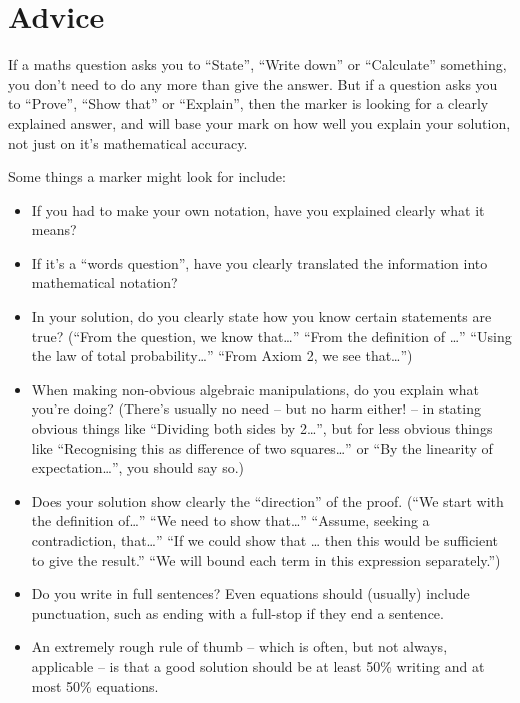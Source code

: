 \documentclass[
  a4paper,
]{book}
\providecommand{\tightlist}{%
  \setlength{\itemsep}{0pt}\setlength{\parskip}{0pt}}
\theoremstyle{definition}
\theoremstyle{definition}
\theoremstyle{definition}
\theoremstyle{definition}
\theoremstyle{remark}
\begin{document}
\hypertarget{advice}{%
\section*{Advice}\label{advice}}

If a maths question asks you to ``State'', ``Write down'' or ``Calculate'' something, you don't need to do any more than give the answer. But if a question asks you to ``Prove'', ``Show that'' or ``Explain'', then the marker is looking for a clearly explained answer, and will base your mark on how well you explain your solution, not just on it's mathematical accuracy.

Some things a marker might look for include:

\begin{itemize}
\tightlist
\item
  If you had to make your own notation, have you explained clearly what it means?
\item
  If it's a ``words question'', have you clearly translated the information into mathematical notation?
\item
  In your solution, do you clearly state how you know certain statements are true? (``From the question, we know that\ldots{}'' ``From the definition of \ldots{}'' ``Using the law of total probability\ldots{}'' ``From Axiom 2, we see that\ldots{}'')
\item
  When making non-obvious algebraic manipulations, do you explain what you're doing? (There's usually no need -- but no harm either! -- in stating obvious things like ``Dividing both sides by 2\ldots{}'', but for less obvious things like ``Recognising this as difference of two squares\ldots{}'' or ``By the linearity of expectation\ldots{}'', you should say so.)
\item
  Does your solution show clearly the ``direction'' of the proof. (``We start with the definition of\ldots{}'' ``We need to show that\ldots{}'' ``Assume, seeking a contradiction, that\ldots{}'' ``If we could show that \ldots{} then this would be sufficient to give the result.'' ``We will bound each term in this expression separately.'')
\item
  Do you write in full sentences? Even equations should (usually) include punctuation, such as ending with a full-stop if they end a sentence.
\item
  An extremely rough rule of thumb -- which is often, but not always, applicable -- is that a good solution should be at least 50\% writing and at most 50\% equations.

\end{itemize}
\end{document}
